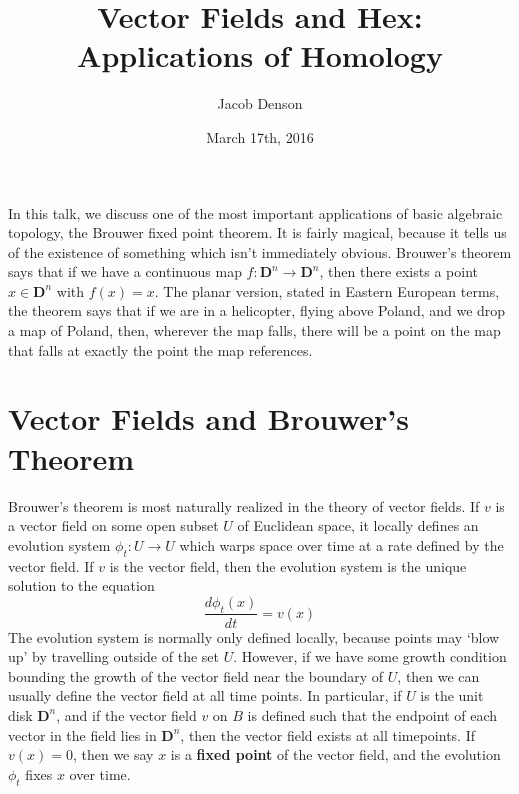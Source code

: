 \documentclass{article}
\title{Vector Fields and Hex: Applications of Homology}
\author{Jacob Denson}
\date{March 17th, 2016}
\theoremstyle{plain}
\begin{document}
\maketitle

In this talk, we discuss one of the most important applications of basic algebraic topology, the Brouwer fixed point theorem. It is fairly magical, because it tells us of the existence of something which isn't immediately obvious. Brouwer's theorem says that if we have a continuous map $f: \mathbf{D}^n \to \mathbf{D}^n$, then there exists a point $x \in \mathbf{D}^n$ with $f(x) = x$. The planar version, stated in Eastern European terms, the theorem says that if we are in a helicopter, flying above Poland, and we drop a map of Poland, then, wherever the map falls, there will be a point on the map that falls at exactly the point the map references.

\section{Vector Fields and Brouwer's Theorem}

Brouwer's theorem is most naturally realized in the theory of vector fields. If $v$ is a vector field on some open subset $U$ of Euclidean space, it locally defines an evolution system $\phi_t: U \to U$ which warps space over time at a rate defined by the vector field. If $v$ is the vector field, then the evolution system is the unique solution to the equation
%
\[ \frac{d\phi_t(x)}{dt} = v(x) \]
%
The evolution system is normally only defined locally, because points may `blow up' by travelling outside of the set $U$. However, if we have some growth condition bounding the growth of the vector field near the boundary of $U$, then we can usually define the vector field at all time points. In particular, if $U$ is the unit disk $\mathbf{D}^n$, and if the vector field $v$ on $B$ is defined such that the endpoint of each vector in the field lies in $\mathbf{D}^n$, then the vector field exists at all timepoints. If $v(x) = 0$, then we say $x$ is a {\bf fixed point} of the vector field, and the evolution $\phi_t$ fixes $x$ over time.

\begin{center}
\end{center}
\end{document}
